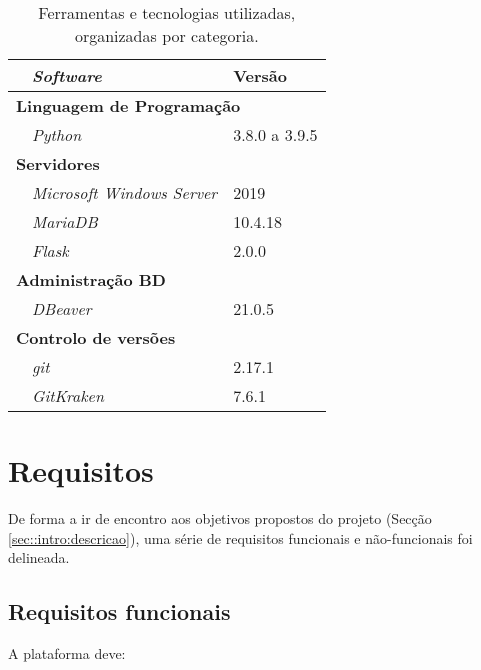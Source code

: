 \begin{table}[!htbp]
    \centering
    \begin{tabular}{p{1cm} l l}
        \toprule
        & {\itshape\bfseries Software} & {\bfseries Versão} \\
        \midrule
        \multicolumn{3}{l}{\bfseries Linguagem de Programação} \\
        & \textit{Python} & 3.8.0 a 3.9.5 \\
        \midrule
        \multicolumn{3}{l}{\bfseries Servidores} \\
        & \textit{Microsoft Windows Server} & 2019 \\
        & \textit{MariaDB} & 10.4.18 \\
        & \textit{Flask} & 2.0.0 \\
        \midrule
        \multicolumn{3}{l}{\bfseries Administração \ac{BD}} \\
        & \textit{DBeaver} & 21.0.5 \\
        \midrule
        \multicolumn{3}{l}{\bfseries Controlo de versões} \\
        & \textit{git} & 2.17.1 \\
        & \textit{GitKraken} & 7.6.1  \\
        \bottomrule
    \end{tabular}
    \caption[Ferramentas utilizadas]{Ferramentas e tecnologias utilizadas, organizadas por categoria.}
    \label{tab::ferramentas}
\end{table}



\section{Requisitos}
\label{sec::engsoft:requisitos}

De forma a ir de encontro aos objetivos propostos do projeto (Secção \ref{sec::intro:descricao}), uma série de requisitos funcionais e não-funcionais foi delineada.

\subsection{Requisitos funcionais}
\label{ssec::engsoft:requisitos:funcionais}

A plataforma deve:

